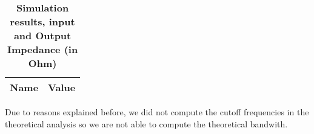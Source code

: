 \begin{table}[H]
\centering
\begin{tabular}{|l|l|}
\hline
{\bf Name} & {\bf Value} \\ \hline
    
    
    
\end{tabular}
\caption{\textbf{Simulation results, input and Output Impedance (in Ohm) }}
\end{table}

Due to reasons explained before, we did not compute the cutoff frequencies in the theoretical analysis so we are not able to compute the theoretical bandwith.